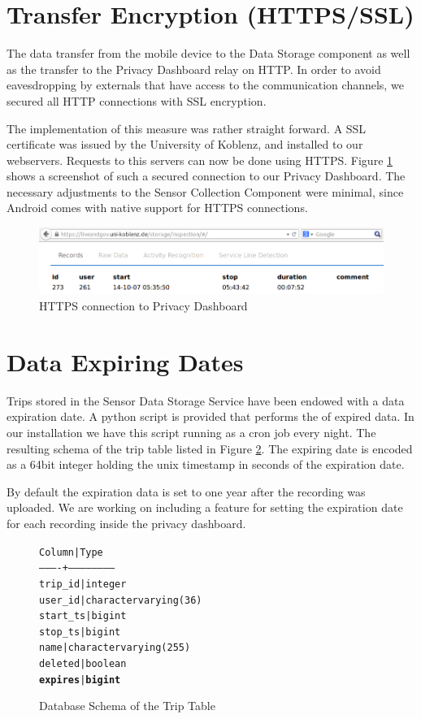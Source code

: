 \pagebreak

\section{Transfer Encryption (HTTPS/SSL)}
The data transfer from the mobile device to the Data Storage component
as well as the transfer to the Privacy Dashboard relay on HTTP. In
order to avoid eavesdropping by externals that have access to the
communication channels, we secured all HTTP connections with SSL
encryption.

The implementation of this measure was rather straight forward. A SSL
certificate was issued by the University of Koblenz, and installed to
our webservers. Requests to this servers can now be done using HTTPS.
Figure \ref{fig:PDHTTPS} shows a screenshot of such a secured
connection to our Privacy Dashboard. The necessary adjustments to the
Sensor Collection Component were minimal, since Android comes with
native support for HTTPS connections.

\begin{figure}[h]
\includegraphics[width=\textwidth]{screenshots/HTTPS.png}
\caption{HTTPS connection to Privacy Dashboard}
\label{fig:PDHTTPS}
\end{figure}

\section{Data Expiring Dates}
Trips stored in the Sensor Data Storage Service have been endowed with
a data expiration date. A python script is provided that performs the
of expired data. In our installation we have this script running as a
cron job every night. The resulting schema of the trip table listed in
Figure \ref{fig:TripScheme}. The expiring date is encoded as a 64bit
integer holding the unix timestamp in seconds of the expiration date.

By default the expiration data is set to one year after the recording
was uploaded. We are working on including a feature for setting the
expiration date for each recording inside the privacy dashboard.

\begin{figure}
\begin{center}
\begin{alltt}
  Column  |          Type
----------+------------------------
 trip_id  | integer
 user_id  | character varying(36)
 start_ts | bigint
 stop_ts  | bigint
 name     | character varying(255)
 deleted  | boolean
 \textbf{expires}  | \textbf{bigint}
\end{alltt}
\end{center}
\caption{Database Schema of the Trip Table}
\label{fig:TripScheme}
\end{figure}

